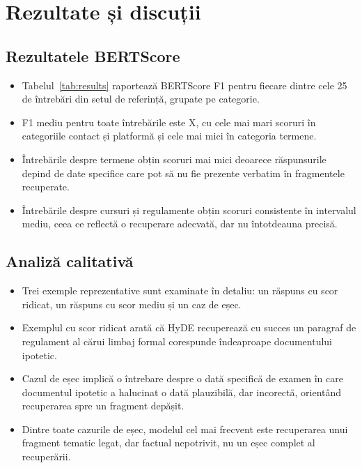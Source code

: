 \documentclass[12pt,a4paper]{report}
\begin{document}
\chapter{Rezultate și discuții}

\section{Rezultatele BERTScore}
\begin{itemize}
    \item Tabelul~\ref{tab:results} raportează BERTScore F1 pentru fiecare dintre cele 25 de întrebări din setul de referință, grupate pe categorie.
    \item F1 mediu pentru toate întrebările este X, cu cele mai mari scoruri în categoriile contact și platformă și cele mai mici în categoria termene.
    \item Întrebările despre termene obțin scoruri mai mici deoarece răspunsurile depind de date specifice care pot să nu fie prezente verbatim în fragmentele recuperate.
    \item Întrebările despre cursuri și regulamente obțin scoruri consistente în intervalul mediu, ceea ce reflectă o recuperare adecvată, dar nu întotdeauna precisă.
\end{itemize}

\section{Analiză calitativă}
\begin{itemize}
    \item Trei exemple reprezentative sunt examinate în detaliu: un răspuns cu scor ridicat, un răspuns cu scor mediu și un caz de eșec.
    \item Exemplul cu scor ridicat arată că HyDE recuperează cu succes un paragraf de regulament al cărui limbaj formal corespunde îndeaproape documentului ipotetic.
    \item Cazul de eșec implică o întrebare despre o dată specifică de examen în care documentul ipotetic a halucinat o dată plauzibilă, dar incorectă, orientând recuperarea spre un fragment depășit.
    \item Dintre toate cazurile de eșec, modelul cel mai frecvent este recuperarea unui fragment tematic legat, dar factual nepotrivit, nu un eșec complet al recuperării.
\end{itemize}
\end{document}
